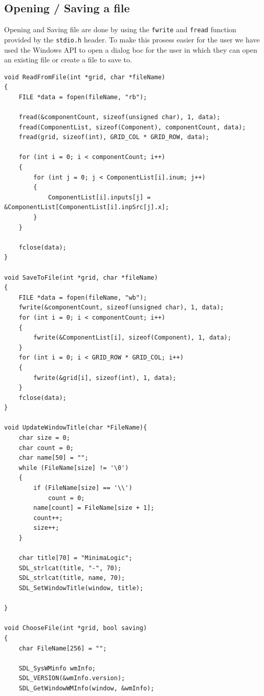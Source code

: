 \documentclass[report]{subfiles}
\begin{document}
\subsection{Opening / Saving a file}
Opening and Saving file are done by using the \texttt{fwrite} and \texttt{fread} function provided by the \texttt{stdio.h} header.
To make this prosess easier for the user we have used the Windows API to open a dialog boc for the user in which they can open an existing file or create a file to save to.
\begin{lstlisting}
void ReadFromFile(int *grid, char *fileName)
{
    FILE *data = fopen(fileName, "rb");

    fread(&componentCount, sizeof(unsigned char), 1, data);
    fread(ComponentList, sizeof(Component), componentCount, data);
    fread(grid, sizeof(int), GRID_COL * GRID_ROW, data);

    for (int i = 0; i < componentCount; i++)
    {
        for (int j = 0; j < ComponentList[i].inum; j++)
        {
            ComponentList[i].inputs[j] = &ComponentList[ComponentList[i].inpSrc[j].x];
        }
    }

    fclose(data);
}

void SaveToFile(int *grid, char *fileName)
{
    FILE *data = fopen(fileName, "wb");
    fwrite(&componentCount, sizeof(unsigned char), 1, data);
    for (int i = 0; i < componentCount; i++)
    {
        fwrite(&ComponentList[i], sizeof(Component), 1, data);
    }
    for (int i = 0; i < GRID_ROW * GRID_COL; i++)
    {
        fwrite(&grid[i], sizeof(int), 1, data);
    }
    fclose(data);
}

void UpdateWindowTitle(char *FileName){
    char size = 0;
    char count = 0;
    char name[50] = "";
    while (FileName[size] != '\0')
    {
        if (FileName[size] == '\\')
            count = 0;
        name[count] = FileName[size + 1];
        count++;
        size++;
    }

    char title[70] = "MinimaLogic";
    SDL_strlcat(title, "-", 70);
    SDL_strlcat(title, name, 70);
    SDL_SetWindowTitle(window, title);

}

void ChooseFile(int *grid, bool saving)
{
    char FileName[256] = "";

    SDL_SysWMinfo wmInfo;
    SDL_VERSION(&wmInfo.version);
    SDL_GetWindowWMInfo(window, &wmInfo);


\end{lstlisting}
\end{document}
